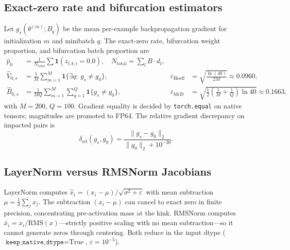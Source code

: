 \documentclass[11pt]{article}
\begin{document}
\subsection{Exact-zero rate and bifurcation estimators}
Let $g_s(\theta^{(m)};B_q)$ be the mean per-example backpropagation gradient for initialization $m$ and minibatch $q$. The exact-zero rate, bifurcation weight proportion, and bifurcation batch proportion are
\begin{align}
\hat p_0 &= \frac{1}{N_{\mathrm{total}}}\sum \mathbf{1}(z_{l,b,i}=\mathtt{0.0}),
\quad N_{\mathrm{total}}=\sum_l B\cdot d_l,\\
\hat V_{0,s} &= \frac{1}{M}\sum_{m=1}^{M}\mathbf{1}\{\exists q:\ g_s\neq g_0\},&
\varepsilon_{\mathrm{Hoeff}} &= \sqrt{\frac{\ln(40)}{2M}}\approx0.0960,\\
\hat B_{0,s} &= \frac{1}{MQ}\sum_{m=1}^{M}\sum_{q=1}^{Q}\mathbf{1}\{g_s\neq g_0\},&
\varepsilon_{\mathrm{McD}} &= \sqrt{\frac12\left(\frac1M+\frac1Q\right)\ln 40}\approx0.1663,
\end{align}
with $M=200$, $Q=100$. Gradient equality is decided by \texttt{torch.equal} on native tensors; magnitudes are promoted to FP64. The relative gradient discrepancy on impacted pairs is
\[
\delta_{\mathrm{rel}}(g_s,g_0)=\frac{\|g_s-g_0\|_2}{\|g_0\|_2+10^{-30}}.
\]

\subsection{LayerNorm versus RMSNorm Jacobians}
LayerNorm computes $\hat x_i=(x_i-\mu)/\sqrt{\sigma^2+\varepsilon}$ with mean subtraction $\mu=\frac1d\sum_j x_j$. The subtraction $(x_i-\mu)$ can cancel to exact zero in finite precision, concentrating pre-activation mass at the kink. RMSNorm computes $\bar x_i=x_i/\mathrm{RMS}(x)$---strictly positive scaling with no mean subtraction---so it cannot generate zeros through centering. Both reduce in the input dtype ($\texttt{keep\_native\_dtype}=\text{True}$, $\varepsilon=10^{-5}$).
\end{document}
